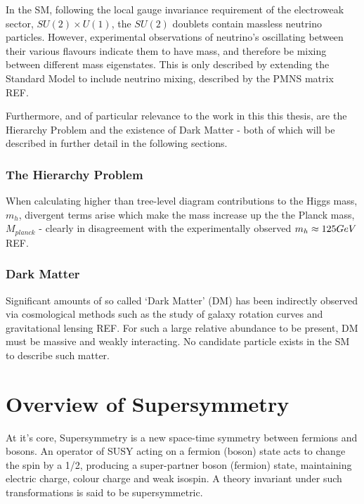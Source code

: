 In the SM, following the local gauge invariance requirement of the electroweak
sector, $SU(2)\times U(1)$, the $SU(2)$ doublets contain
massless neutrino particles. However, experimental observations of neutrino's
oscillating between their various flavours indicate them to have mass, and
therefore be mixing between different mass eigenstates. This is only described
by extending the Standard Model to include neutrino mixing, described by the
PMNS matrix REF.

Furthermore, and of particular relevance to the work in this this thesis, are
the Hierarchy Problem and the existence of Dark Matter - both of which will be
described in further detail in the following sections.

\subsubsection{The Hierarchy Problem}

When calculating higher than tree-level diagram contributions to the Higgs mass,
$m_h$, divergent terms arise which make the mass increase up the the Planck
mass, $M_{planck}$ - clearly in disagreement with the experimentally observed
$m_h \approx 125 GeV$ REF.

\subsubsection{Dark Matter}
Significant amounts of so called `Dark Matter' (DM) has been indirectly observed
via cosmological methods such as the study of galaxy rotation curves and
gravitational lensing REF. For such a large relative abundance to be present, DM
must be massive and weakly interacting. No candidate particle exists in the SM
to describe such matter.

\section{Overview of Supersymmetry}  %
\label{sec:theory_overview}
At it's core, Supersymmetry is a new space-time symmetry
between fermions and bosons. An operator of SUSY acting on a fermion (boson)
state acts to change the spin by a 1/2, producing a super-partner boson 
(fermion) state, maintaining electric charge, colour charge and weak isospin. A
theory invariant under such transformations is said to be supersymmetric.


